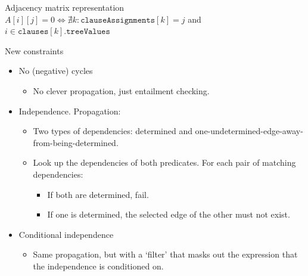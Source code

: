 \documentclass{beamer}
\begin{document}
\begin{frame}
  \begin{block}{Adjacency matrix representation}
    $A[i][j] = 0 \iff \nexists k: \texttt{clauseAssignments}[k] = j$ and $i
    \in \texttt{clauses}[k].\texttt{treeValues}$
  \end{block}
  \begin{block}{New constraints}
    \begin{itemize}
    \item No (negative) cycles
      \begin{itemize}
      \item No clever propagation, just entailment checking.
      \end{itemize}
    \item Independence. Propagation:
      \begin{itemize}
      \item Two types of dependencies: determined and
        one-undetermined-edge-away-from-being-determined.
      \item Look up the dependencies of both predicates. For each pair of
        matching dependencies:
        \begin{itemize}
        \item If both are determined, fail.
        \item If one is determined, the selected edge of the other must not
          exist.
        \end{itemize}
      \end{itemize}
    \item Conditional independence
      \begin{itemize}
      \item Same propagation, but with a `filter' that masks out the expression
        that the independence is conditioned on.
      \end{itemize}
    \end{itemize}
  \end{block}
\end{frame}
\end{document}
